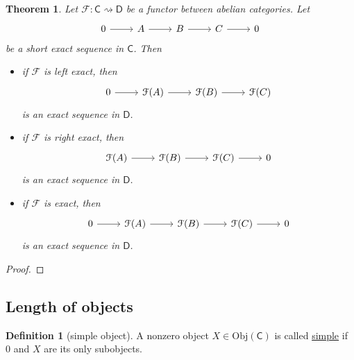\documentclass[a4paper,10pt]{scrreprt}
\newcommand{\defn}[1]{\ul{#1}}
\newcommand{\Obj}{\mathrm{Obj}}
\theoremstyle{definition}
\newtheorem{definition}{Definition}[section]
\theoremstyle{plain}
\newtheorem{theorem}{Theorem}[section]
\theoremstyle{remark}
\begin{document}
\begin{theorem}
  Let $\mathcal{F}\colon \mathsf{C} \rightsquigarrow \mathsf{D}$ be a functor between abelian categories. Let
  \begin{equation*}
    \begin{tikzcd}
      0
      \arrow[r]
      & A
      \arrow[r]
      & B
      \arrow[r]
      & C
      \arrow[r]
      & 0
    \end{tikzcd}
  \end{equation*}
  be a short exact sequence in $\mathsf{C}$. Then 
  \begin{itemize}
    \item if $\mathcal{F}$ is left exact, then
      \begin{equation*}
        \begin{tikzcd}
          0
          \arrow[r]
          & \mathcal{F}(A)
          \arrow[r]
          & \mathcal{F}(B)
          \arrow[r]
          & \mathcal{F}(C)
        \end{tikzcd}
      \end{equation*}
      is an exact sequence in $\mathsf{D}$.

    \item if $\mathcal{F}$ is right exact, then
      \begin{equation*}
        \begin{tikzcd}
          \mathcal{F}(A)
          \arrow[r]
          & \mathcal{F}(B)
          \arrow[r]
          & \mathcal{F}(C)
          \arrow[r]
          & 0
        \end{tikzcd}
      \end{equation*}
      is an exact sequence in $\mathsf{D}$.
    \item if $\mathcal{F}$ is exact, then
      \begin{equation*}
        \begin{tikzcd}
          0
          \arrow[r]
          & \mathcal{F}(A)
          \arrow[r]
          & \mathcal{F}(B)
          \arrow[r]
          & \mathcal{F}(C)
          \arrow[r]
          & 0
        \end{tikzcd}
      \end{equation*}
      is an exact sequence in $\mathsf{D}$.
  \end{itemize}
\end{theorem}
\begin{proof}

\end{proof}

\subsection{Length of objects}
\begin{definition}[simple object]
  \label{def:simpleobject}
  A nonzero object $X \in \Obj(\mathsf{C})$ is called \defn{simple} if $0$ and $X$ are its only subobjects.
\end{definition}
\end{document}
